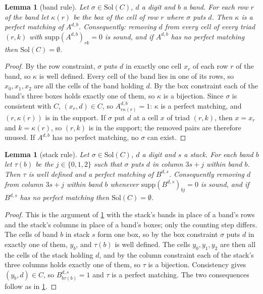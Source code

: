 \documentclass[11pt]{article}
\newtheorem{lemma}[theorem]{Lemma}
\theoremstyle{definition}
\theoremstyle{plain}
\begin{document}
\begin{lemma}[band rule]
\label{lem:band}
Let $\sigma\in\mathrm{Sol}(C)$, $d$ a digit and $b$ a band. For each row $r$ of the band let $\kappa(r)$ be the box of
the cell of row $r$ where $\sigma$ puts $d$. Then $\kappa$ is a perfect matching of $A^{d,b}$. Consequently: removing $d$
from every cell of every triad $(r,k)$ with $\mathrm{supp}(A^{d,b})_{rk}=0$ is sound, and if $A^{d,b}$ has no perfect
matching then $\mathrm{Sol}(C)=\emptyset$.
\end{lemma}
\begin{proof}
By the row constraint, $\sigma$ puts $d$ in exactly one cell $x_r$ of each row $r$ of the band, so $\kappa$ is well
defined. Every cell of the band lies in one of its rows, so $x_0,x_1,x_2$ are all the cells of the band holding $d$. By
the box constraint each of the band's three boxes holds exactly one of them, so $\kappa$ is a bijection. Since $\sigma$
is consistent with $C$, $(x_r,d)\in C$, so $A^{d,b}_{r\kappa(r)}=1$: $\kappa$ is a perfect matching, and
$(r,\kappa(r))$ is in the support. If $\sigma$ put $d$ at a cell $x$ of triad $(r,k)$, then $x=x_r$ and $k=\kappa(r)$,
so $(r,k)$ is in the support; the removed pairs are therefore unused. If $A^{d,b}$ has no perfect matching, no
$\sigma$ can exist.
\end{proof}

\begin{lemma}[stack rule]
\label{lem:stack}
Let $\sigma\in\mathrm{Sol}(C)$, $d$ a digit and $s$ a stack. For each band $b$ let $\tau(b)$ be the $j\in\{0,1,2\}$ such that
$\sigma$ puts $d$ in column $3s+j$ within band $b$. Then $\tau$ is well defined and a perfect matching of $B^{d,s}$.
Consequently removing $d$ from column $3s+j$ within band $b$ whenever $\mathrm{supp}(B^{d,s})_{bj}=0$ is sound, and if
$B^{d,s}$ has no perfect matching then $\mathrm{Sol}(C)=\emptyset$.
\end{lemma}
\begin{proof}
This is the argument of \cref{lem:band} with the stack's bands in place of a band's rows and the stack's columns in
place of a band's boxes; only the counting step differs. The cells of band $b$ in stack $s$ form one box, so by the
box constraint $\sigma$ puts $d$ in exactly one of them, $y_b$, and $\tau(b)$ is well defined. The cells $y_0,y_1,y_2$
are then all the cells of the stack holding $d$, and by the column constraint each of the stack's three columns holds
exactly one of them, so $\tau$ is a bijection. Consistency gives $(y_b,d)\in C$, so $B^{d,s}_{b\tau(b)}=1$ and $\tau$ is
a perfect matching. The two consequences follow as in \cref{lem:band}.
\end{proof}
\end{document}
